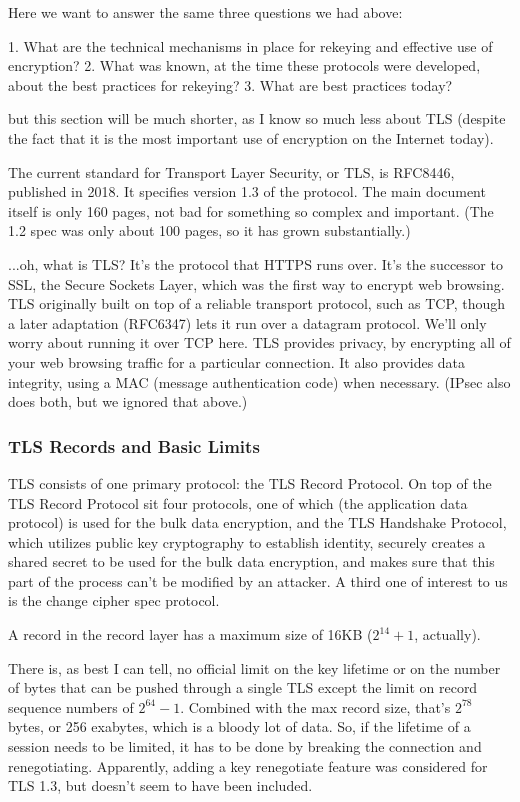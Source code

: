 \documentclass[%
 aip,
 jmp,%
 amsmath,amssymb,
 reprint,%
]{revtex4-1}
\begin{document}
Here we want to answer the same three questions we had above:

1. What are the technical mechanisms in place for rekeying and
   effective use of encryption?
2. What was known, at the time these protocols were developed, about
   the best practices for rekeying?
3. What are best practices today?

but this section will be much shorter, as I know so much less about
TLS (despite the fact that it is the most important use of encryption
on the Internet today).

The current standard for Transport Layer Security, or TLS, is RFC8446,
published in 2018.  It specifies version 1.3 of the protocol.  The
main document itself is only 160 pages, not bad for something so
complex and important.  (The 1.2 spec was only about 100 pages, so it
has grown substantially.)

...oh, what is TLS?  It's the protocol that HTTPS runs over.  It's the
successor to SSL, the Secure Sockets Layer, which was the first way to
encrypt web browsing.  TLS originally built on top of a reliable
transport protocol, such as TCP, though a later adaptation (RFC6347)
lets it run over a datagram protocol.  We'll only worry about running
it over TCP here.  TLS provides privacy, by encrypting all of your web
browsing traffic for a particular connection.  It also provides data
integrity, using a MAC (message authentication code) when necessary.
(IPsec also does both, but we ignored that above.)

\subsubsection{TLS Records and Basic Limits}

TLS consists of one primary protocol: the TLS Record Protocol.  On top
of the TLS Record Protocol sit four protocols, one of which (the
application data protocol) is used for the bulk data encryption, and
the TLS Handshake Protocol, which utilizes public key cryptography to
establish identity, securely creates a shared secret to be used for
the bulk data encryption, and makes sure that this part of the process
can't be modified by an attacker.  A third one of interest to us is
the change cipher spec protocol.

A record in the record layer has a maximum size of 16KB ($2^{14}+1$, actually).

There is, as best I can tell, no official limit on the key lifetime or
on the number of bytes that can be pushed through a single TLS except
the limit on record sequence numbers of $2^{64}-1$.  Combined with the
max record size, that's $2^{78}$ bytes, or 256 exabytes, which is a bloody
lot of data.  So, if the lifetime of a session needs to be limited, it
has to be done by breaking the connection and renegotiating.
Apparently, adding a key renegotiate feature was considered for
TLS 1.3, but doesn't seem to have been included.
\end{document}
